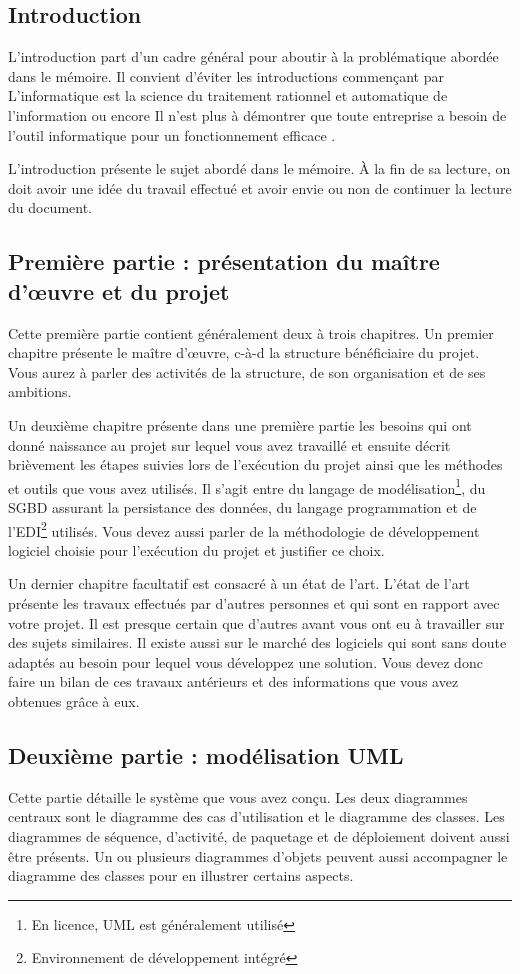 \documentclass[12pt]{article}
\begin{document}
\subsection{Introduction}
L'introduction part d'un cadre général pour aboutir à la problématique abordée dans le mémoire. Il convient d'éviter les introductions commençant par \og L'informatique est la science du traitement rationnel et automatique de l'information \fg{} ou encore \og Il n'est plus à démontrer que toute entreprise a besoin de l'outil informatique pour un fonctionnement efficace \fg{}.

L'introduction présente le sujet abordé dans le mémoire. \`A la fin de sa lecture, on doit avoir une idée du travail effectué et avoir envie ou non de continuer la lecture du document.

\subsection{Première partie : présentation du maître d'\oe{}uvre et du projet}
Cette première partie contient généralement deux à trois chapitres. Un premier chapitre présente le maître d'\oe{}uvre, c-à-d la structure bénéficiaire du projet. Vous aurez à parler des activités de la structure, de son organisation et de ses ambitions.

Un deuxième chapitre présente dans une première partie les besoins qui ont donné naissance au projet sur lequel vous avez travaillé et ensuite décrit brièvement les étapes suivies lors de l'exécution du projet ainsi que les méthodes et outils que vous avez utilisés. Il s'agit entre du langage de modélisation\footnote{En licence, UML est généralement utilisé}, du SGBD assurant la persistance des données, du langage programmation et de l'EDI\footnote{Environnement de développement intégré} utilisés. Vous devez aussi parler de la méthodologie de développement logiciel choisie pour l'exécution du projet et justifier ce choix.

Un dernier chapitre facultatif est consacré à un état de l'art. L'état de l'art présente les travaux effectués par d'autres personnes et qui sont en rapport avec votre projet. Il est presque certain que d'autres avant vous ont eu à travailler sur des sujets similaires. Il existe aussi sur le marché des logiciels qui sont sans doute adaptés au besoin pour lequel vous développez une solution. Vous devez donc faire un bilan de ces travaux antérieurs et des informations que vous avez obtenues grâce à eux.

\subsection{Deuxième partie : modélisation UML}
Cette partie détaille le système que vous avez conçu. Les deux diagrammes centraux sont le diagramme des cas d'utilisation et le diagramme des classes. Les diagrammes de séquence, d'activité, de paquetage et de déploiement doivent aussi être présents. Un ou plusieurs diagrammes d'objets peuvent aussi accompagner le diagramme des classes pour en illustrer certains aspects.
\end{document}
